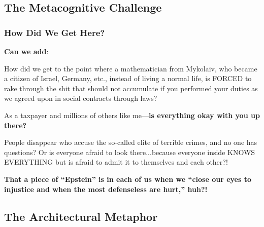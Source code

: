 \documentclass[11pt,a4paper]{article}
\theoremstyle{definition}
\theoremstyle{remark}
\begin{document}
\begin{center}
\end{center}

\subsection{The Metacognitive Challenge}

\subsubsection{How Did We Get Here?}

\textbf{Can we add}:

How did we get to the point where a mathematician from Mykolaiv, who became a citizen of Israel, Germany, etc., instead of living a normal life, is FORCED to rake through the shit that should not accumulate if you performed your duties as we agreed upon in social contracts through laws?

As a taxpayer and millions of others like me—\textbf{is everything okay with you up there?}

People disappear who accuse the so-called elite of terrible crimes, and no one has questions? Or is everyone afraid to look there...because everyone inside KNOWS EVERYTHING but is afraid to admit it to themselves and each other?!

\textbf{That a piece of ``Epstein'' is in each of us when we ``close our eyes to injustice and when the most defenseless are hurt,'' huh?!}

\subsection{The Architectural Metaphor}
\end{document}
